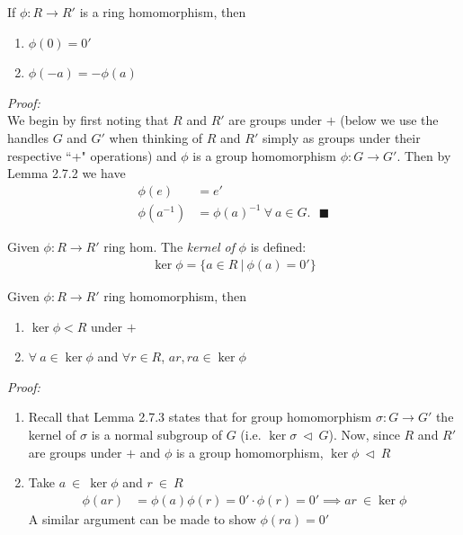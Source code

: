 \begin{lemma}
If $\phi : R\rightarrow R'$ is a ring homomorphism, then
\begin{enumerate}
    \item $\phi(0)=0'$
    \item $\phi(-a)=-\phi(a)$
\end{enumerate}
\textit{Proof:}\\
We begin by first noting that $R$ and $R'$ are groups under $+$ (below we use the handles $G$ and
$G'$ when thinking of $R$ and $R'$ simply as groups under their respective ``+" operations) and
$\phi$ is a group homomorphism $\phi:G \rightarrow G'$. Then by Lemma 2.7.2 we have
\begin{align}
    \phi(e)&=e' \nonumber \\
    \phi(a^{-1}) &= \phi(a)^{-1} \ \forall \ a \in G. \ \ \ \blacksquare \nonumber
\end{align}
\end{lemma}

\begin{definition}
Given $\phi:R\rightarrow R'$ ring hom. The \textit{kernel of} $\phi$ is defined:
\begin{align}
    \ker \phi = \{ a \in R \ | \ \phi(a)=0'\} \nonumber
\end{align}
\end{definition}

\begin{lemma}
Given $\phi: R \rightarrow R'$ ring homomorphism, then
\begin{enumerate}[label=\roman*)]
    \item $\ker \phi < R$ under $+$
    \item $\forall \ a \in \ker \phi $ and $\forall r \in R$, $ar, ra \in \ker\phi$
\end{enumerate}
\textit{Proof:}\\
\begin{enumerate}[label=\roman*)]
    \item Recall that Lemma 2.7.3 states that for group homomorphism $\sigma : G \rightarrow G'$ the
    kernel of $\sigma$ is a normal subgroup of $G$ (i.e. $\ker{\sigma} \ \triangleleft \ G$). Now,
    since $R$ and $R'$ are groups under $+$ and $\phi$ is a group homomorphism,
    $\ker{\phi} \ \triangleleft \ R$
    \item Take $a \ \in \ \ker{\phi} $ and $r \ \in \ R$
    \begin{align}
        \phi(ar) &= \phi(a)\phi(r) = 0' \cdot \phi(r)=0' \implies ar \ \in \ker{\phi} \nonumber
    \end{align}
    A similar argument can be made to show $\phi(ra)=0'$
\end{enumerate}

\end{lemma}

